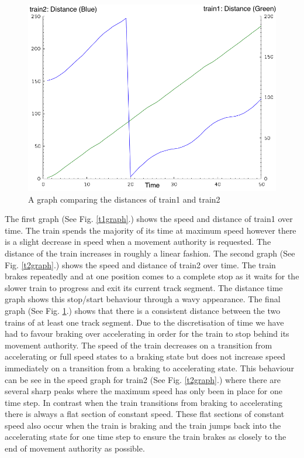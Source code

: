 \begin{figure}
\label{t1t2graph}
\begin{center}
\includegraphics[scale=0.5]{t1t2graph.png}
\end{center}
\caption{A graph comparing the distances of train1 and train2}
\end{figure}

The first graph (See Fig. \ref{t1graph}.) shows the speed and distance of train1 over time. The train spends the majority of its time at maximum speed however there is a slight decrease in speed when a movement authority is requested. The distance of the train increases in roughly a linear fashion. The second graph (See Fig. \ref{t2graph}.) shows the speed and distance of train2 over time. The train brakes repeatedly and at one position comes to a complete stop as it waits for the slower train to progress and exit its current track segment. The distance time graph shows this stop/start behaviour through a wavy appearance. The final graph (See Fig. \ref{t1t2graph}.) shows that there is a consistent distance between the two trains of at least one track segment. Due to the discretisation of time we have had to favour braking over accelerating in order for the train to stop behind its movement authority. The speed of the train decreases on a transition from accelerating or full speed states to a braking state but does not increase speed immediately on a transition from a braking to accelerating state. This behaviour can be see in the speed graph for train2 (See Fig. \ref{t2graph}.) where there are several sharp peaks where the maximum speed has only been in place for one time step. In contrast when the train transitions from braking to accelerating there is always a flat section of constant speed. These flat sections of constant speed also occur when the train is braking and the train jumps back into the accelerating state for one time step to ensure the train brakes as closely to the end of movement authority as possible.


